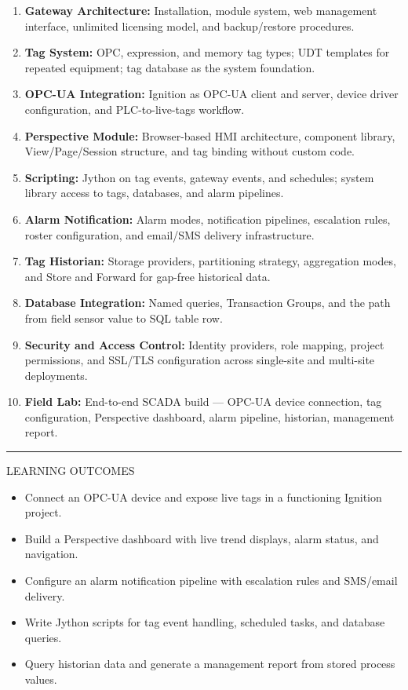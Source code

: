 \documentclass[10pt]{article}
\begin{document}
\begin{enumerate}\small
  \item \textbf{Gateway Architecture:} Installation, module system, web management interface, unlimited licensing model, and backup/restore procedures.
  \item \textbf{Tag System:} OPC, expression, and memory tag types; UDT templates for repeated equipment; tag database as the system foundation.
  \item \textbf{OPC-UA Integration:} Ignition as OPC-UA client and server, device driver configuration, and PLC-to-live-tags workflow.
  \item \textbf{Perspective Module:} Browser-based HMI architecture, component library, View/Page/Session structure, and tag binding without custom code.
  \item \textbf{Scripting:} Jython on tag events, gateway events, and schedules; system library access to tags, databases, and alarm pipelines.
  \item \textbf{Alarm Notification:} Alarm modes, notification pipelines, escalation rules, roster configuration, and email/SMS delivery infrastructure.
  \item \textbf{Tag Historian:} Storage providers, partitioning strategy, aggregation modes, and Store and Forward for gap-free historical data.
  \item \textbf{Database Integration:} Named queries, Transaction Groups, and the path from field sensor value to SQL table row.
  \item \textbf{Security and Access Control:} Identity providers, role mapping, project permissions, and SSL/TLS configuration across single-site and multi-site deployments.
  \item \textbf{Field Lab:} End-to-end SCADA build — OPC-UA device connection, tag configuration, Perspective dashboard, alarm pipeline, historian, management report.
\end{enumerate}

\smallskip
{\color{onavy}\rule{\linewidth}{0.4pt}}
\smallskip
{\small\sffamily\color{ogray}\MakeUppercase{Learning Outcomes}}
\smallskip

\begin{itemize}\small
  \item Connect an OPC-UA device and expose live tags in a functioning Ignition project.
  \item Build a Perspective dashboard with live trend displays, alarm status, and navigation.
  \item Configure an alarm notification pipeline with escalation rules and SMS/email delivery.
  \item Write Jython scripts for tag event handling, scheduled tasks, and database queries.
  \item Query historian data and generate a management report from stored process values.
\end{itemize}
\end{document}
